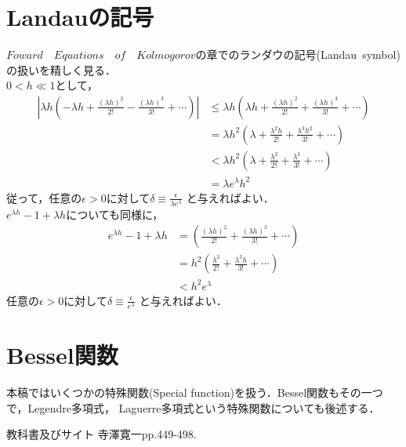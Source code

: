 \documentclass[a4j,papersize,disablejfam,slide,14pt]{jsarticle}
\def\exp#1{e^{#1}} %
\begin{document}
\section{{\rm Landau}の記号}
\label{sec:appendix_landau}
	$Foward\quad Equations\quad of\quad Kolmogorov$の章でのランダウの記号{\rm (Landau\ symbol)}の扱いを精しく見る．\\
	$0 < h \ll 1$として，
    \begin{align}
    	\left| \lambda h \left(- \lambda h + \frac{(\lambda h)^2}{2!} - \frac{(\lambda h)^3}{3!} + \cdots \right) \right|
        &\leq \lambda h \left(\lambda h + \frac{(\lambda h)^2}{2!} + \frac{(\lambda h)^3}{3!} + \cdots \right) \\
        &= \lambda h^2 \left(\lambda + \frac{\lambda^2 h}{2!} + \frac{\lambda^3 h^2}{3!} + \cdots \right) \\
        &< \lambda h^2 \left(\lambda + \frac{\lambda^2}{2!} + \frac{\lambda^3}{3!} + \cdots \right) \\
        &= \lambda \exp{\lambda} h^2
    \end{align}
    従って，任意の$\epsilon > 0$に対して$\delta \equiv \frac{\epsilon}{\lambda \exp{\lambda}}$ と与えればよい．\\
    $\exp{\lambda h} - 1 + \lambda h$についても同様に，
    \begin{align}
    	\exp{\lambda h} - 1 + \lambda h &= \left(\frac{(\lambda h)^2}{2!} + \frac{(\lambda h)^3}{3!} + \cdots \right) \\
        &= h^2 \left(\frac{\lambda^2}{2!} + \frac{\lambda^3 h}{3!} + \cdots \right) \\
        &< h^2 \exp{\lambda}
    \end{align}
    任意の$\epsilon > 0$に対して$\delta \equiv \frac{\epsilon}{\exp{\lambda}}$ と与えればよい．

\section{{\rm Bessel}関数}
	本稿ではいくつかの特殊関数({\rm Special function})を扱う．{\rm Bessel}関数もその一つで，{\rm Legendre}多項式，
    {\rm Laguerre}多項式という特殊関数についても後述する．
    \begin{itembox}[l]{教科書及びサイト}
    	{\rm 寺澤寛一\cite{terakan}pp.449-498.}
    \end{itembox}
	
\end{document}
